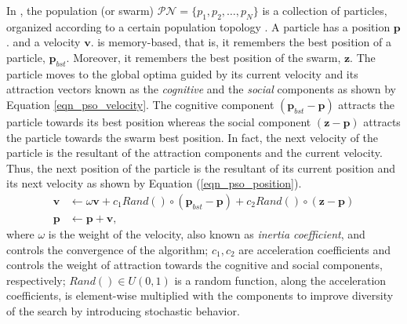 In \pso, the population (or swarm) $\mathcal{PN}=\{p_1,p_2,…,p_N\}$ is a collection of particles, organized according to a certain population topology \cite{Liu2016TopologyOptimization}. A particle has a position $\textbf{p}$. and a velocity $\textbf{v}$. \pso{} is memory-based, that is, it remembers the best position of a particle, $\textbf{p}_{bst}$. Moreover, it remembers the best position of the swarm, $\textbf{z}$. The particle moves to the global optima guided by its current velocity and its attraction vectors known as the \textit{cognitive} and the \textit{social} components as shown by Equation \ref{eqn_pso_velocity}. The cognitive component $(\textbf{p}_{bst}-\textbf{p})$ attracts the particle towards its best position whereas the social component $(\textbf{z}-\textbf{p})$ attracts the particle towards the swarm best position. In fact, the next velocity of the particle is the resultant of the attraction components and the current velocity. Thus, the next position of the particle is the resultant of its current position and its next velocity as shown by Equation (\ref{eqn_pso_position}).
\begin{align}
\label{eqn_pso_velocity}
\textbf{v} &\leftarrow  \omega\textbf{v} + c_1Rand()\circ(\textbf{p}_{bst}-\textbf{p}) + c_2Rand()\circ(\textbf{z}-\textbf{p})\\
\label{eqn_pso_position}
\textbf{p} &\leftarrow \textbf{p} + \textbf{v},
\end{align}
where $\omega$ is the weight of the velocity, also known as \textit{inertia coefficient}, and controls the convergence of the algorithm; $c_1, c_2$ are acceleration coefficients and controls the weight of attraction towards the cognitive and social components, respectively; $Rand()\in U(0,1)$ is a random function, along the acceleration coefficients, is element-wise multiplied with the components to improve diversity of the search by introducing stochastic behavior.

